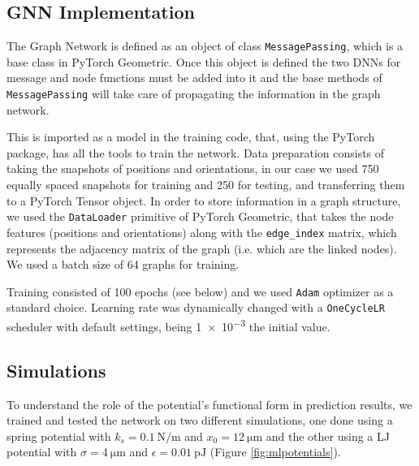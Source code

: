 \documentclass[../../master_thesis_np.tex]{subfiles}
\begin{document}
\subsection{GNN Implementation}
The Graph Network is defined as an object of class \verb|MessagePassing|, which is a base class in PyTorch Geometric.
Once this object is defined the two DNNs for message and node functions must be added into it and the base methods of \verb|MessagePassing| will take care of propagating the information in the graph network.

This is imported as a model in the training code, that, using the PyTorch package, has all the tools to train the network.
Data preparation consists of taking the snapshots of positions and orientations, in our case we used 750 equally spaced snapshots for training and 250 for testing, and transferring them to a PyTorch Tensor object.
In order to store information in a graph structure, we used the \verb|DataLoader| primitive of PyTorch Geometric, that takes the node features (positions and orientations) along with the \verb|edge_index| matrix, which represents the adjacency matrix of the graph (i.e. which are the linked nodes).
We used a batch size of 64 graphs for training.

Training consisted of 100 epochs (see below) and we used \verb|Adam| optimizer as a standard choice.
Learning rate was dynamically changed with a \verb|OneCycleLR| scheduler with default settings, being \num{1e-3} the initial value.

\subsection{Simulations}
To understand the role of the potential's functional form in prediction results, we trained and tested the network on two different simulations, one done using a spring potential with $k_s = \SI{0.1}{\newton\per\meter}$ and $x_0 = \SI{12}{\um}$ and the other using a LJ potential with $\sigma = \SI{4}{\um}$ and $\epsilon = \SI{0.01}{\pico\joule}$ (Figure \ref{fig:mlpotentials}).
\end{document}
